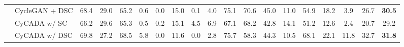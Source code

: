 \documentclass{article}
\begin{document}
\begin{table*}[]
{\begin{tabular}{c|l|cccccccccccccccc|c}
\cellcolor{white}&CycleGAN + DSC & 68.4 & 29.0 & 65.2 & 0.6 & 0.0 & 15.0 & 0.1 & 4.0 & 75.1 & 70.6 & 45.0 & 11.0 & 54.9 & 18.2 & 3.9 & 26.7 & \textbf{30.5} \\ \hhline{~|-|-|-|-|-|-|-|-|-|-|-|-|-|-|-|-|-|-}
&CyCADA w/ SC & 66.2 & 29.6 & 65.3 & 0.5 & 0.2 & 15.1 & 4.5 & 6.9 & 67.1 & 68.2 & 42.8 & 14.1 & 51.2 & 12.6 & 2.4 & 20.7 & 29.2 \\

\cellcolor{white}\multirow{-4}{*}{SYNTHIA}&CyCADA w/ DSC & 69.8 & 27.2 & 68.5 & 5.8 & 0.0 & 11.6 & 0.0 & 2.8 & 75.7 & 58.3 & 44.3 & 10.5 & 68.1 & 22.1 & 11.8 & 32.7 & \textbf{31.8} \\
\bottomrule
\end{tabular}
}
\label{tab:ablation_1}
\end{table*}
\end{document}
